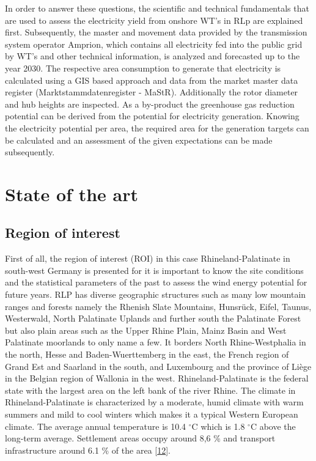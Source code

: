 \documentclass[a4paper,11pt]{article}
\begin{document}
In order to answer these questions, the scientific and technical fundamentals that are used to assess the electricity yield from onshore WT's in RLp are explained first. Subsequently, the master and movement data provided by the transmission system operator Amprion, which contains all electricity fed into the public grid by WT's and other technical information, is analyzed and forecasted up to the year 2030. The respective area consumption to generate that electricity is calculated using a GIS based approach and data from the market master data register (Marktstammdatenregister - MaStR). Additionally the rotor diameter and hub heights are inspected. As a by-product the greenhouse gas reduction potential can be derived from the potential for electricity generation. Knowing the electricity potential per area, the required area for the generation targets can be calculated and an assessment of the given expectations can be made subsequently.

\hypertarget{state-of-the-art}{%
\section{State of the art}\label{state-of-the-art}}

\hypertarget{region-of-interest}{%
\subsection{Region of interest}\label{region-of-interest}}

First of all, the region of interest (ROI) in this case Rhineland-Palatinate in south-west Germany is presented for it is important to know the site conditions and the statistical parameters of the past to assess the wind energy potential for future years. RLP has diverse geographic structures such as many low mountain ranges and forests namely the Rhenish Slate Mountains, Hunsrück, Eifel, Taunus, Westerwald, North Palatinate Uplands and further south the Palatinate Forest but also plain areas such as the Upper Rhine Plain, Mainz Basin and West Palatinate moorlands to only name a few. It borders North Rhine-Westphalia in the north, Hesse and Baden-Wuerttemberg in the east, the French region of Grand Est and Saarland in the south, and Luxembourg and the province of Liège in the Belgian region of Wallonia in the west. Rhineland-Palatinate is the federal state with the largest area on the left bank of the river Rhine. The climate in Rhineland-Palatinate is characterized by a moderate, humid climate with warm summers and mild to cool winters which makes it a typical Western European climate. The average annual temperature is 10.4 \(^\circ\)C which is 1.8 \(^\circ\)C above the long-term average. Settlement areas occupy around 8,6 \% and transport infrastructure around 6.1 \% of the area {[}\protect\hyperlink{ref-StateStatisticalOfficeofRhinelandPalatinate.2020}{12}{]}.
\end{document}
